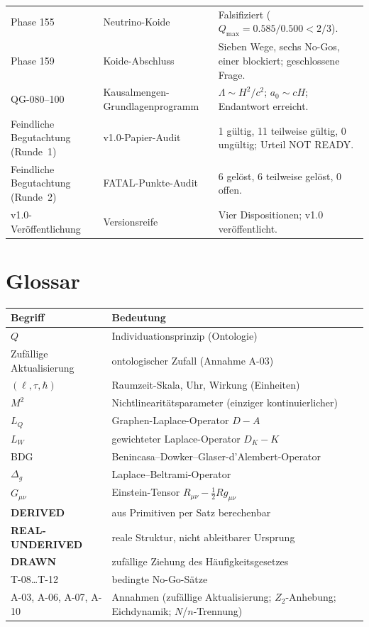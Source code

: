 \documentclass[10pt,twoside,openany]{book}
\newcommand{\derived}{\textbf{DERIVED}}
\newcommand{\realunder}{\textbf{REAL-UNDERIVED}}
\newcommand{\drawn}{\textbf{DRAWN}}
\begin{document}
\begin{longtable}{p{4.2cm}p{5.2cm}p{5.6cm}}
Phase 155 & Neutrino-Koide & Falsifiziert ($Q_{\max}=0.585/0.500<2/3$). \\
Phase 159 & Koide-Abschluss & Sieben Wege, sechs No-Gos, einer blockiert; geschlossene Frage. \\
QG-080--100 & Kausalmengen-Grundlagenprogramm & $\Lambda\sim H^2/c^2$; $a_0\sim cH$; Endantwort erreicht. \\
Feindliche Begutachtung (Runde~1) & v1.0-Papier-Audit & 1 gültig, 11 teilweise gültig, 0 ungültig; Urteil NOT READY. \\
Feindliche Begutachtung (Runde~2) & FATAL-Punkte-Audit & 6 gelöst, 6 teilweise gelöst, 0 offen. \\
v1.0-Veröffentlichung & Versionsreife & Vier Dispositionen; v1.0 veröffentlicht. \\
\bottomrule
\end{longtable}

\chapter{Glossar}
\label{app:glossary}

\begin{center}
\begin{tabular}{lp{10cm}}
\toprule
Begriff & Bedeutung \\
\midrule
$Q$ & Individuationsprinzip (Ontologie) \\
Zufällige Aktualisierung & ontologischer Zufall (Annahme A-03) \\
$(\ell,\tau,\hbar)$ & Raumzeit-Skala, Uhr, Wirkung (Einheiten) \\
$M^2$ & Nichtlinearitätsparameter (einziger kontinuierlicher) \\
$L_Q$ & Graphen-Laplace-Operator $D-A$ \\
$L_W$ & gewichteter Laplace-Operator $D_K-K$ \\
BDG & Benincasa--Dowker--Glaser-d'Alembert-Operator \\
$\Delta_g$ & Laplace--Beltrami-Operator \\
$G_{\mu\nu}$ & Einstein-Tensor $R_{\mu\nu}-\tfrac12 R g_{\mu\nu}$ \\
\derived & aus Primitiven per Satz berechenbar \\
\realunder & reale Struktur, nicht ableitbarer Ursprung \\
\drawn & zufällige Ziehung des Häufigkeitsgesetzes \\
T-08\dots T-12 & bedingte No-Go-Sätze \\
A-03, A-06, A-07, A-10 & Annahmen (zufällige Aktualisierung; $Z_2$-Anhebung; Eichdynamik; $N$/$n$-Trennung) \\
\bottomrule
\end{tabular}
\end{center}
\end{document}

